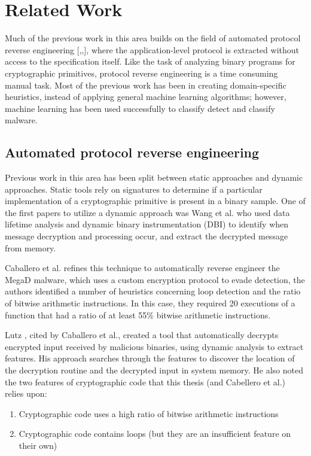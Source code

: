 \chapter{Related Work}

Much of the previous work in this area builds on the field of automated protocol reverse engineering [\cite{caballero:polyglot},\cite{lin},\cite{Wondracek}], where the application-level protocol is extracted without access to the specification itself.  Like the task of analyzing binary programs for cryptographic primitives, protocol reverse engineering is a time consuming manual task.  Most of the previous work has been in creating domain-specific heuristics, instead of applying general machine learning algorithms; however, machine learning has been used successfully to classify detect and classify malware.

\section{Automated protocol reverse engineering}
Previous work in this area has been split between static approaches and dynamic approaches.  Static tools rely on signatures to determine if a particular implementation of a cryptographic primitive is present in a binary sample.  One of the first papers to utilize a dynamic approach was Wang et al. \cite{wang} who used data lifetime analysis and dynamic binary instrumentation (DBI) to identify when message decryption and processing occur, and extract the decrypted message from memory.

Caballero et al. refines this technique to automatically reverse engineer the MegaD malware\cite{caballero:dispatcher}, which uses a custom encryption protocol to evade detection, the authors identified a number of heuristics concerning loop detection and the ratio of bitwise arithmetic instructions.  In this case, they required 20 executions of a function that had a ratio of at least 55\% bitwise arithmetic instructions.

Lutz \cite{lutz}, cited by Caballero et al., created a tool that automatically decrypts encrypted input received by malicious binaries, using dynamic analysis to extract features.  His approach searches through the features to discover the location of the decryption routine and the decrypted input in system memory.  He also noted the two features of cryptographic code that this thesis (and Cabellero et al.) relies upon:
\begin{enumerate}
	\item Cryptographic code uses a high ratio of bitwise arithmetic instructions
	\item Cryptographic code contains loops (but they are an insufficient feature on their own)
\end{enumerate}

